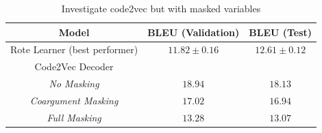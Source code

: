 \begin{table}[ht!]
\begin{center}
\begin{tabular}{ c | c | c }
    Model                             & BLEU (Validation)  & BLEU (Test)    \\
    \hline
    Rote Learner (best performer)          & $ 11.82 \pm  0.16 $ & $ 12.61 \pm 0.12 $ \\
    \hline
    Code2Vec  Decoder                             &  &  \\
    \textit{No Masking}                               & $ 18.94 $ & $ 18.13$ \\
    \textit{Coargument Masking}              & $ 17.02 $ & $ 16.94 $ \\                  
    \textit{Full Masking}                & $ 13.28 $ & $ 13.07 $ \\
    \hline
\end{tabular}
\caption {Investigate code2vec but with masked variables}
\label{table:code_2_vec_masked}
\end{center}
\end{table}


